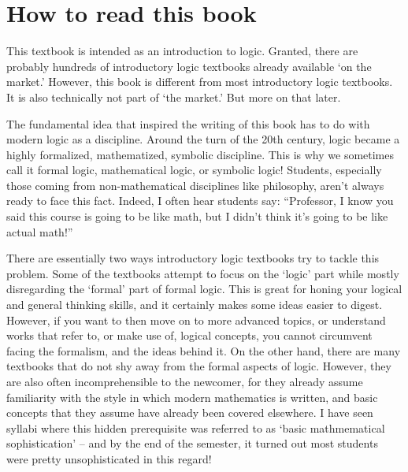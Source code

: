 

\chapter{How to read this book}

This textbook is intended as an introduction to logic. Granted, there are probably hundreds of introductory logic textbooks already available `on the market.'  However, this book is different from most introductory logic textbooks. It is also technically not part of `the market.' But more on that later.

The fundamental idea that inspired the writing of this book has to do with modern logic as a discipline. Around the turn of the 20th century, logic became a highly formalized, mathematized, symbolic discipline. This is why we sometimes call it formal logic, mathematical logic, or symbolic logic! Students, especially those coming from non-mathematical disciplines like philosophy, aren't always ready to face this fact. Indeed, I often hear students say: ``Professor, I know you said this course is going to be like math, but I didn't think it's going to be like actual math!'' 

There are essentially two ways introductory logic textbooks try to tackle this problem. Some of the textbooks attempt to focus on the `logic' part while mostly disregarding the `formal' part of formal logic. This is great for honing your logical and general thinking skills, and it certainly makes some ideas easier to digest. However, if you want to then move on to more advanced topics, or understand works that refer to, or make use of, logical concepts, you cannot circumvent facing the formalism, and the ideas behind it. On the other hand, there are many textbooks that do not shy away from the formal aspects of logic. However, they are also often incomprehensible to the newcomer, for they already assume familiarity with the style in which modern mathematics is written, and basic concepts that they assume have already been covered elsewhere. I have seen syllabi where this hidden prerequisite was referred to as `basic mathmematical sophistication' -- and by the end of the semester, it turned out most students were pretty unsophisticated in this regard!


